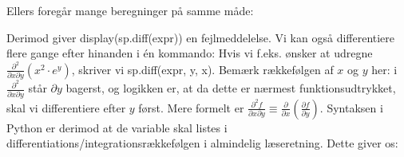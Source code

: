 \documentclass[letterpaper,10pt,english]{jupyterBook}
\begin{document}
Ellers foregår mange beregninger på samme måde:

\begin{sphinxVerbatim}[commandchars=\\\{\}]
             
        
        
\end{sphinxVerbatim}

\noindent{}

\noindent{}

Derimod giver display(sp.diff(expr)) en fejlmeddelelse. Vi kan også differentiere flere gange efter hinanden i én kommando: Hvis vi f.eks. ønsker at udregne \(\frac{\partial^2}{\partial x \partial y}\left ( x^2\cdot e^y\right )\), skriver vi sp.diff(expr, y, x). Bemærk rækkefølgen af \(x\) og \(y\) her: i \(\frac{\partial^2}{\partial x \partial y}\) står \(\partial y\) bagerst, og logikken er, at da dette er nærmest funktionsudtrykket, skal vi differentiere efter \(y\) først. Mere formelt er \(\frac{\partial^2f}{\partial x \partial y} \equiv \frac{\partial}{\partial x}\left ( \frac{\partial f}{\partial y} \right )\). Syntaksen i Python er derimod at de variable skal listes  i differentiations/integrationsrækkefølgen i almindelig læseretning. Dette giver os:

\begin{sphinxVerbatim}[commandchars=\\\{\}]
  
 
  
 
  
\end{sphinxVerbatim}
\end{document}
